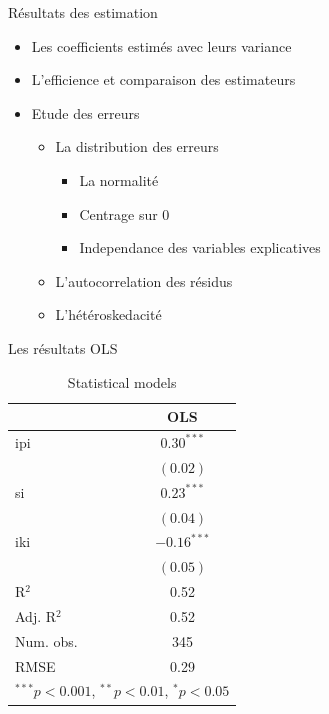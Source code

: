\documentclass[11pt,ignorenonframetext,]{beamer}
\providecommand{\tightlist}{%
  \setlength{\itemsep}{0pt}\setlength{\parskip}{0pt}}
\begin{document}
\begin{frame}{Résultats des estimation}
\protect\hypertarget{resultats-des-estimation}{}

\begin{itemize}
\tightlist
\item
  Les coefficients estimés avec leurs variance
\item
  L'efficience et comparaison des estimateurs
\item
  Etude des erreurs

  \begin{itemize}
  \tightlist
  \item
    La distribution des erreurs

    \begin{itemize}
    \tightlist
    \item
      La normalité
    \item
      Centrage sur 0
    \item
      Independance des variables explicatives
    \end{itemize}
  \item
    L'autocorrelation des résidus
  \item
    L'hétéroskedacité
  \end{itemize}
\end{itemize}

\end{frame}

\begin{frame}{Les résultats OLS}
\protect\hypertarget{les-resultats-ols}{}

\tiny

\begin{table}
\begin{center}
\begin{tabular}{l c }
\hline
 & OLS \\
\hline
ipi        & $0.30^{***}$  \\
           & $(0.02)$      \\
si         & $0.23^{***}$  \\
           & $(0.04)$      \\
iki        & $-0.16^{***}$ \\
           & $(0.05)$      \\
\hline
R$^2$      & 0.52          \\
Adj. R$^2$ & 0.52          \\
Num. obs.  & 345           \\
RMSE       & 0.29          \\
\hline
\multicolumn{2}{l}{\scriptsize{$^{***}p<0.001$, $^{**}p<0.01$, $^*p<0.05$}}
\end{tabular}
\caption{Statistical models}
\label{table : ols}
\end{center}
\end{table}

\normalsize

\end{frame}
\end{document}
